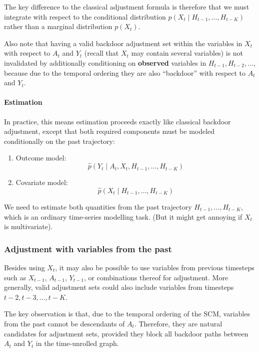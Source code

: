 \documentclass[11pt]{article}
\theoremstyle{definition}
\theoremstyle{remark}
\begin{document}
The key difference to the classical adjustment formula is therefore that we must integrate with respect to the conditional distribution $p(X_t \mid H_{t-1},\dots,H_{t-K})$ rather than a marginal distribution $p(X_t)$. 

Also note that having a valid backdoor adjustment set within the variables in $X_t$ with respect to $A_t$ and $Y_t$ (recall that $X_t$ may contain several variables) is not invalidated by additionally conditioning on \textbf{observed} variables in $H_{t-1}, H_{t-2}, \ldots$, because due to the temporal ordering they are also ``backdoor'' with respect to $A_t$ and $Y_t$.

\paragraph{Estimation}

In practice, this means estimation proceeds exactly like classical backdoor adjustment, except that both required components must be modeled conditionally on the past trajectory:

\begin{enumerate}

\item Outcome model:
\[
\hat{p}(Y_t \mid A_t, X_t, H_{t-1},\dots,H_{t-K})
\]

\item Covariate model:
\[
\hat{p}(X_t \mid H_{t-1},\dots,H_{t-K})
\]

\end{enumerate}

We need to estimate both quantities from the past trajectory $H_{t-1}, \dots, H_{t-K}$, which is an ordinary time-series modelling task. (But it might get annoying if $X_t$ is multivariate).


\subsubsection{Adjustment with variables from the past}

Besides using $X_t$, it may also be possible to use variables from previous timesteps such as $X_{t-1}$, $A_{t-1}$, $Y_{t-1}$, or combinations thereof for adjustment. More generally, valid adjustment sets could also include variables from timesteps $t-2, t-3, \dots, t-K$.

The key observation is that, due to the temporal ordering of the SCM, variables from the past cannot be descendants of $A_t$. Therefore, they are natural candidates for adjustment sets, provided they block all backdoor paths between $A_t$ and $Y_t$ in the time-unrolled graph.
\end{document}
